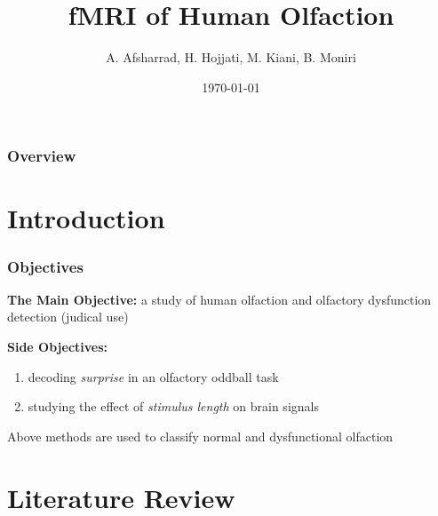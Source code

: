 \documentclass{beamer}
\title[Hmuan Olfaction]{fMRI of Human Olfaction} %
\author{A. Afsharrad, H. Hojjati, M. Kiani, B. Moniri} %
\institute[Sharif University of Technology] %
{
Ambient Intelligence Research Lab (AIR Lab)\\ \textbf{Sharif University of Technology} \\ 
\medskip
}
\date{\today} %
\begin{document}
\begin{frame}
\titlepage %
\end{frame}

\begin{frame}
\frametitle{Overview} %
\tableofcontents %
\end{frame}


\section{Introduction} 

\begin{frame}
\frametitle{Objectives}
\textbf{The Main Objective: }
a study of human olfaction and olfactory dysfunction detection (judical use)
\\
\vspace{0.5cm}

\textbf{Side Objectives:}
\begin{enumerate}
	\item
	decoding \emph{surprise} in an olfactory oddball task
	\item
	studying the effect of \emph{stimulus length} on brain signals
\end{enumerate}
Above methods are used to classify normal and dysfunctional olfaction
\end{frame}


\section{Literature Review} 
\end{document}
